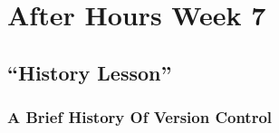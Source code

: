 \chapter{After Hours Week 7}
\section{``History Lesson''}
\subsection{A Brief History Of Version Control}
